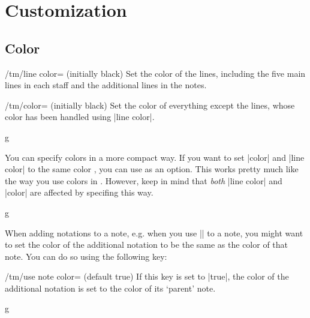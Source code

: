 \section{Customization}\label{sec:custom}
\subsection{Color}\label{sec:custom:color}
\begin{key}{/tm/line color= (initially black)}
  Set the color of the lines, including the five main lines in each staff and 
  the additional lines in the notes.
\end{key}
\begin{key}{/tm/color= (initially black)}
  Set the color of everything except the lines, whose color has been handled using 
  |line color|.
\end{key}
\begin{codeexample}[]
\begin{tmline}
\begin{tmstaff}[color=red,line color=blue]{g}{}
\end{tmstaff}
\end{tmline}
\end{codeexample}
You can specify colors in a more compact way. If you want to set |color| and 
|line color| to the same color , you can use  as an 
option. This works pretty much like the way you use colors in \tikzname. However, 
keep in mind that \emph{both} |line color| and |color| are affected by specifing 
this way.
\begin{codeexample}[]
\begin{tmline}
\begin{tmstaff}{g}{}
\end{tmstaff}
\end{tmline}
\end{codeexample}
When adding notations to a note, e.g. when you use |\tmappendaccidental| to a 
note, you might want to set the color of the additional notation to be the same 
as the color of that note. You can do so using the following key:
\begin{key}{/tm/use note color= (default true)}
  If this key is set to |true|, the color of the additional notation is set to 
  the color of its `parent' note.
\end{key}
\begin{codeexample}[]
\begin{tmline}
\begin{tmstaff}{g}{}
\end{tmstaff}
\end{tmline}
\end{codeexample}
